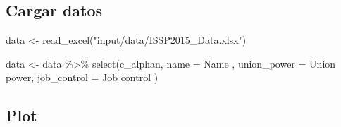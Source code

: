 \documentclass[
  letterpaper,
  DIV=11,
  numbers=noendperiod]{scrreprt}
\newenvironment{Shaded}{\begin{snugshade}}{\end{snugshade}}
\newcommand{\AttributeTok}[1]{\textcolor[rgb]{0.40,0.45,0.13}{#1}}
\newcommand{\FunctionTok}[1]{\textcolor[rgb]{0.28,0.35,0.67}{#1}}
\newcommand{\NormalTok}[1]{\textcolor[rgb]{0.00,0.23,0.31}{#1}}
\newcommand{\OtherTok}[1]{\textcolor[rgb]{0.00,0.23,0.31}{#1}}
\newcommand{\SpecialCharTok}[1]{\textcolor[rgb]{0.37,0.37,0.37}{#1}}
\newcommand{\StringTok}[1]{\textcolor[rgb]{0.13,0.47,0.30}{#1}}
\begin{document}
\hypertarget{cargar-datos-1}{%
\subsection{Cargar datos}\label{cargar-datos-1}}

\begin{Shaded}
\begin{Highlighting}[]
\NormalTok{data }\OtherTok{\textless{}{-}} \FunctionTok{read\_excel}\NormalTok{(}\StringTok{"input/data/ISSP2015\_Data.xlsx"}\NormalTok{)}
\end{Highlighting}
\end{Shaded}

\begin{Shaded}
\begin{Highlighting}[]
\NormalTok{data }\OtherTok{\textless{}{-}}\NormalTok{ data }\SpecialCharTok{\%\textgreater{}\%} 
  \FunctionTok{select}\NormalTok{(c\_alphan, }\AttributeTok{name =}\NormalTok{ Name , }\AttributeTok{union\_power =} \StringTok{\textasciigrave{}}\AttributeTok{Union power}\StringTok{\textasciigrave{}}\NormalTok{, }\AttributeTok{job\_control =} \StringTok{\textasciigrave{}}\AttributeTok{Job control}\StringTok{\textasciigrave{}}\NormalTok{ )}
\end{Highlighting}
\end{Shaded}

\hypertarget{plot}{%
\subsection{Plot}\label{plot}}
\end{document}
